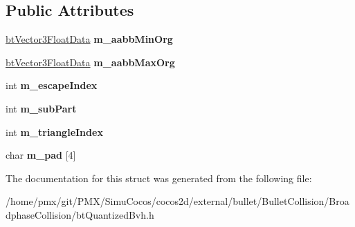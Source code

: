 \subsection*{Public Attributes}
\begin{DoxyCompactItemize}
\item 
\mbox{\label{structbtOptimizedBvhNodeFloatData_afe8619902ac9c23ed387f5407b04864e}} 
\hyperlink{structbtVector3FloatData}{bt\+Vector3\+Float\+Data} {\bfseries m\+\_\+aabb\+Min\+Org}
\item 
\mbox{\label{structbtOptimizedBvhNodeFloatData_a830ef80210da1df78fb23307fe6284f4}} 
\hyperlink{structbtVector3FloatData}{bt\+Vector3\+Float\+Data} {\bfseries m\+\_\+aabb\+Max\+Org}
\item 
\mbox{\label{structbtOptimizedBvhNodeFloatData_ac298d881245db2199ab68f0e223e7922}} 
int {\bfseries m\+\_\+escape\+Index}
\item 
\mbox{\label{structbtOptimizedBvhNodeFloatData_a13e8c2f0d64c7539a21688da92f19b28}} 
int {\bfseries m\+\_\+sub\+Part}
\item 
\mbox{\label{structbtOptimizedBvhNodeFloatData_a9d718a3a3d2984d339d8a6240263aaea}} 
int {\bfseries m\+\_\+triangle\+Index}
\item 
\mbox{\label{structbtOptimizedBvhNodeFloatData_a5c183c94cd2bd642ec5412d81249a218}} 
char {\bfseries m\+\_\+pad} \mbox{[}4\mbox{]}
\end{DoxyCompactItemize}


The documentation for this struct was generated from the following file\+:\begin{DoxyCompactItemize}
\item 
/home/pmx/git/\+P\+M\+X/\+Simu\+Cocos/cocos2d/external/bullet/\+Bullet\+Collision/\+Broadphase\+Collision/bt\+Quantized\+Bvh.\+h\end{DoxyCompactItemize}
